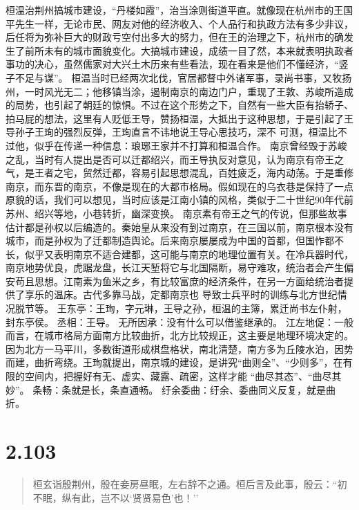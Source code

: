 \documentclass[]{book}
\begin{document}
桓温治荆州搞城市建设，``丹楼如霞''，治当涂则街道平直。就像现在杭州市的王国平先生一样，无论市民、网友对他的经济收入、个人品行和执政方法有多少非议，后任将为弥补巨大的财政亏空付出多大的努力，但在王的治理之下，杭州市的确发生了前所未有的城市面貌变化。大搞城市建设，成绩一目了然，本来就表明执政者事功的决心，虽然儒家对大兴土木历来有些看法，现在看来是他们不懂经济，``竖子不足与谋''。
桓温当时已经两次北伐，官居都督中外诸军事，录尚书事，又牧扬州，一时风光无二；他移镇当涂，遏制南京的南边门户，重现了王敦、苏峻所造成的局势，也引起了朝廷的惊惧。不过在这个形势之下，自然有一些大臣有抬轿子、拍马屁的想法，这里有人贬低王导，赞扬桓温，大抵出于这种思想，于是引起了王导孙子王珣的强烈反弹，王珣直言不讳地说王导心思技巧，深不
可测，桓温比不过他，似乎在传递一种信息：琅琊王家并不打算和桓温合作。
南京曾经毁于苏峻之乱，当时有人提出是否可以迁都绍兴，而王导执反对意见，认为南京有帝王之气，是王者之宅，贸然迁都，容易引起思想混乱，百姓疲乏，海内动荡。于是重修南京，而东晋的南京，不像是现在的大都市格局。假如现在的乌衣巷是保持了一点原貌的话，我们可以想见，当时应该是江南小镇的风格，类似于二十世纪90年代前苏州、绍兴等地，小巷转折，幽深变换。
南京素有帝王之气的传说，但那些故事估计都是孙权以后编造的。秦始皇从来没有到过南京，在三国以前，南京根本没有城市，而是孙权为了迁都制造舆论。后来南京屡屡成为中国的首都，但国怍都不长，似乎又表明南京不适合建都，这可能与南京的地理位置有关。在冷兵器时代，南京地势优良，虎踞龙盘，长江天堑将它与北国隔断，易守难攻，统治者会产生偏安苟且思想。江南素为鱼米之乡，有比较富庶的经济条件，在另一方面给统治者提供了享乐的温床。古代多靠马战，定都南京也
导致士兵平时的训练与北方世纪情况脱节等。
王东亭：王珣，字元琳，王导之孙，桓温的主簿，累迁尚书左仆射，封东亭侯。
丞相：王导。 无所因承：没有什么可以借鉴继承的。
江左地促：一般而言，在城市格局方面南方比较曲折，北方比较规正，这主要是地理环境决定的。因为北方一马平川，多数街道形成棋盘格状，南北清楚，南方多为丘陵水泊，因势而建，曲折弯绕。王珣就提出，南京城的建设，是讲究``曲则全''、``少则多''，在有限的空间内，把握好有无、虚实、藏露、疏密，这样才能
``曲尽其态''、``曲尽其妙''。 条畅：条就是长，条直通畅。
纡余委曲：纡余、委曲同义反复，就是曲折。

\section{2.103}\label{section-149}

\begin{quote}
桓玄诣殷荆州，殷在妾房昼眠，左右辞不之通。桓后言及此事，殷云：``初不眠，纵有此，岂不以`贤贤易色'也！''
\end{quote}
\end{document}
